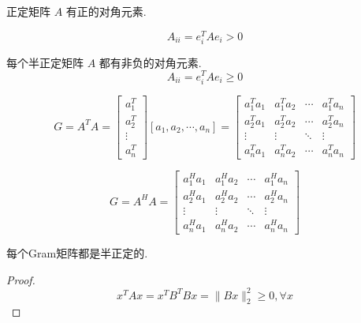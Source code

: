 \begin{theorem}[正定矩阵对角元素性质]
    正定矩阵 $ A $ 有正的对角元素.

    $$
A_{i i}=e_{i}^{T} A e_{i}>0
$$
\end{theorem}

\begin{theorem}[半正定矩阵对角元素性质]
    每个半正定矩阵 $ A $ 都有非负的对角元素.
$$
A_{i i}=e_{i}^{T} A e_{i} \geq 0
$$
\end{theorem}

\begin{definition}
    \label{Def:Gram}

    $$ G=A^{T} A=\left[\begin{array}{c}a_{1}^{T} \\ a_{2}^{T} \\ \vdots \\ a_{n}^{T}\end{array}\right]\left[a_{1}, a_{2}, \cdots, a_{n}\right]=\left[\begin{array}{cccc}a_{1}^{T} a_{1} & a_{1}^{T} a_{2} & \cdots & a_{1}^{T} a_{n} \\ a_{2}^{T} a_{1} & a_{2}^{T} a_{2} & \cdots & a_{2}^{T} a_{n} \\ \vdots & \vdots & \ddots & \vdots \\ a_{n}^{T} a_{1} & a_{n}^{T} a_{2} & \cdots & a_{n}^{T} a_{n}\end{array}\right] $$
\end{definition}

\begin{definition}
    $$ G=A^{H} A=\left[\begin{array}{cccc}a_{1}^{H} a_{1} & a_{1}^{H} a_{2} & \cdots & a_{1}^{H} a_{n} \\ a_{2}^{H} a_{1} & a_{2}^{H} a_{2} & \cdots & a_{2}^{H} a_{n} \\ \vdots & \vdots & \ddots & \vdots \\ a_{n}^{H} a_{1} & a_{n}^{H} a_{2} & \cdots & a_{n}^{H} a_{n}\end{array}\right] $$
\end{definition}

\begin{theorem}
    每个Gram矩阵都是半正定的.
\end{theorem}

\begin{proof}
    $$ x^{T} A x=x^{T} B^{T} B x=\|B x\|_{2}^{2} \geq 0 , \forall x $$
\end{proof}

